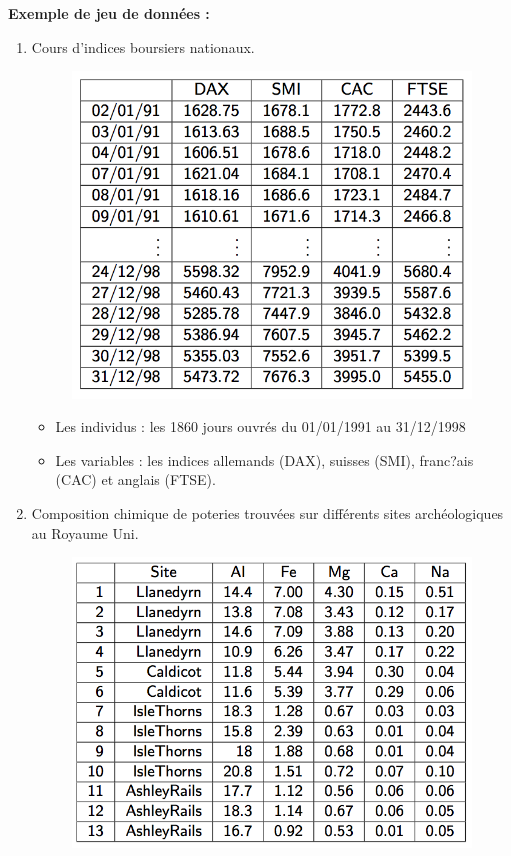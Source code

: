 \textbf{Exemple de jeu de données :} 
\begin{enumerate}
\item Cours d'indices boursiers nationaux.
\begin{figure}[H]\begin{center}\includegraphics[scale=0.5]{ilu/ccm1.png}\end{center}\end{figure}
\begin{itemize}
\item Les individus : les 1860 jours ouvrés du 01/01/1991 au 31/12/1998
\item Les variables : les indices allemands (DAX), suisses (SMI), franc?ais (CAC) et anglais (FTSE).
\end{itemize}
\item Composition chimique de poteries trouvées sur différents sites archéologiques au Royaume Uni.
\begin{figure}[H]\begin{center}\includegraphics[scale=0.5]{ilu/ccm2.png}\end{center}\end{figure}

\end{enumerate}
